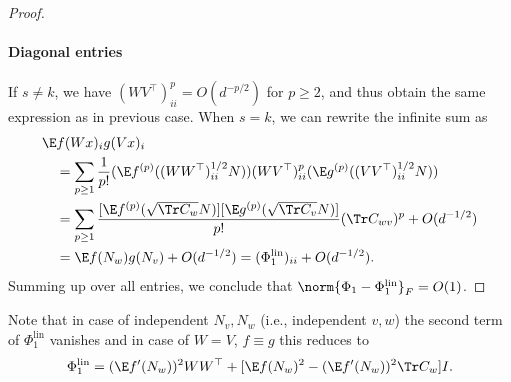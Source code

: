 \begin{proof}
\paragraph{Diagonal entries}
If \(s \neq k\), we have \((W  V^{\top})^p_{ii} = O(d^{-p/2})\) for \(p \geq 2\), and thus obtain the same expression as in previous case. When \(s = k\), we can rewrite the infinite sum as
\begin{equation}
\begin{aligned}
&\E f(Wx)_i g(Vx)_i \\
&\quad = \sum_{p\geq 1} \frac{1}{p!} (\E f^{(p)}((W W^\top)_{ii}^{1/2} N) ) (W  V^\top )_{ii}^{p} ( \E g^{(p)}((V V^\top)_{ii}^{1/2} N) ) \\
    &\quad = \sum_{p\geq 1}\frac{[\E f^{(p)}(\sqrt{\Tr C_w} N)][\E g^{(p)}(\sqrt{\Tr C_v} N)]}{p!} (\Tr C_{wv})^p + O(d^{-1/2}) \\
    &\quad = \E f(N_w)g(N_v) + O(d^{-1/2}) = (\Phi_1^{\mathrm{lin}})_{ii} + O(d^{-1/2}).
\end{aligned}
\end{equation}
Summing up over all entries, we conclude that \(\norm{\Phi_1 - \Phi_1^{\mathrm{lin}}}_F = O(1)\).
\end{proof}
Note that in case of independent \(N_v, N_w\) (i.e., independent \(v, w\)) the second term of \(\Phi_1^{\mathrm{lin}}\) vanishes and in case of $W = V$, \(f \equiv g\) this reduces to 
\begin{equation}
    \Phi_1^{\mathrm{lin}} =  (\E f'(N_w))^2 W W^\top + [\E f(N_w)^2-(\E f'(N_w))^2\Tr C_w] I.
\end{equation}
